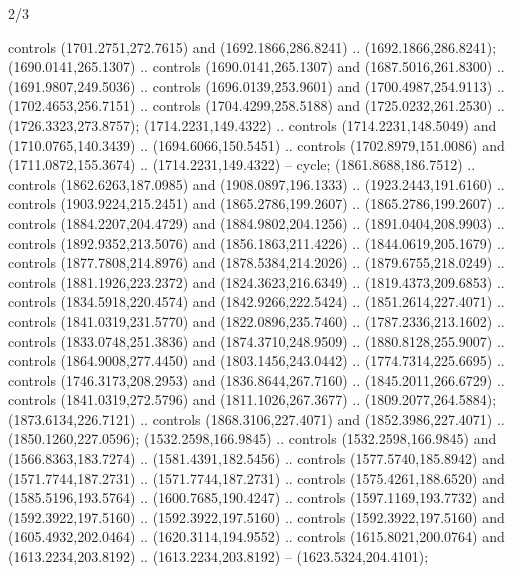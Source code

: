 \begin{flagdescription}{2/3}
\begin{scope}[shift=(c),scale=\flagwidth/391]
\begin{scope}[draw=black,fill=orange,line join=round,line cap=round,y=0.1mm, x=0.1mm,
 line width=0.001\flagwidth, yscale=-1,xscale=1,xshift=-172.5mm,yshift=-25mm]
  controls (1701.2751,272.7615) and (1692.1866,286.8241) ..
  (1692.1866,286.8241);
 (1690.0141,265.1307) .. controls (1690.0141,265.1307) and
  (1687.5016,261.8300) .. (1691.9807,249.5036) .. controls (1696.0139,253.9601)
  and (1700.4987,254.9113) .. (1702.4653,256.7151) .. controls
  (1704.4299,258.5188) and (1725.0232,261.2530) .. (1726.3323,273.8757);
 (1714.2231,149.4322) .. controls (1714.2231,148.5049) and
  (1710.0765,140.3439) .. (1694.6066,150.5451) .. controls (1702.8979,151.0086)
  and (1711.0872,155.3674) .. (1714.2231,149.4322) -- cycle;
 (1861.8688,186.7512) .. controls (1862.6263,187.0985) and
  (1908.0897,196.1333) .. (1923.2443,191.6160) .. controls (1903.9224,215.2451)
  and (1865.2786,199.2607) .. (1865.2786,199.2607) .. controls
  (1884.2207,204.4729) and (1884.9802,204.1256) .. (1891.0404,208.9903) ..
  controls (1892.9352,213.5076) and (1856.1863,211.4226) .. (1844.0619,205.1679)
  .. controls (1877.7808,214.8976) and (1878.5384,214.2026) ..
  (1879.6755,218.0249) .. controls (1881.1926,223.2372) and (1824.3623,216.6349)
  .. (1819.4373,209.6853) .. controls (1834.5918,220.4574) and
  (1842.9266,222.5424) .. (1851.2614,227.4071) .. controls (1841.0319,231.5770)
  and (1822.0896,235.7460) .. (1787.2336,213.1602) .. controls
  (1833.0748,251.3836) and (1874.3710,248.9509) .. (1880.8128,255.9007) ..
  controls (1864.9008,277.4450) and (1803.1456,243.0442) .. (1774.7314,225.6695)
  .. controls (1746.3173,208.2953) and (1836.8644,267.7160) ..
  (1845.2011,266.6729) .. controls (1841.0319,272.5796) and (1811.1026,267.3677)
  .. (1809.2077,264.5884);
 (1873.6134,226.7121) .. controls (1868.3106,227.4071) and
  (1852.3986,227.4071) .. (1850.1260,227.0596);
 (1532.2598,166.9845) .. controls (1532.2598,166.9845) and
  (1566.8363,183.7274) .. (1581.4391,182.5456) .. controls (1577.5740,185.8942)
  and (1571.7744,187.2731) .. (1571.7744,187.2731) .. controls
  (1575.4261,188.6520) and (1585.5196,193.5764) .. (1600.7685,190.4247) ..
  controls (1597.1169,193.7732) and (1592.3922,197.5160) .. (1592.3922,197.5160)
  .. controls (1592.3922,197.5160) and (1605.4932,202.0464) ..
  (1620.3114,194.9552) .. controls (1615.8021,200.0764) and (1613.2234,203.8192)
  .. (1613.2234,203.8192) -- (1623.5324,204.4101);
\end{scope}
\end{scope}
\fi
\framecode{}
\end{flagdescription}
